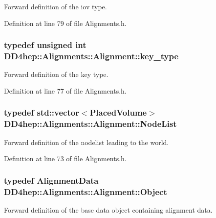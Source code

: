 Forward definition of the iov type. 

Definition at line 79 of file Alignments.h.\hypertarget{class_d_d4hep_1_1_alignments_1_1_alignment_ab824a65f935a0c79b9ea1a7a85014b88}{
\subsubsection[{key\_\-type}]{\setlength{\rightskip}{0pt plus 5cm}typedef unsigned int {\bf DD4hep::Alignments::Alignment::key\_\-type}}}
\label{class_d_d4hep_1_1_alignments_1_1_alignment_ab824a65f935a0c79b9ea1a7a85014b88}


Forward definition of the key type. 

Definition at line 77 of file Alignments.h.\hypertarget{class_d_d4hep_1_1_alignments_1_1_alignment_a83282984664b4e1117f46d8a8bc40cb7}{
\subsubsection[{NodeList}]{\setlength{\rightskip}{0pt plus 5cm}typedef std::vector$<${\bf PlacedVolume}$>$ {\bf DD4hep::Alignments::Alignment::NodeList}}}
\label{class_d_d4hep_1_1_alignments_1_1_alignment_a83282984664b4e1117f46d8a8bc40cb7}


Forward definition of the nodelist leading to the world. 

Definition at line 73 of file Alignments.h.\hypertarget{class_d_d4hep_1_1_alignments_1_1_alignment_a3ed6fd0370cb7b8015d772df7ff005fc}{
\subsubsection[{Object}]{\setlength{\rightskip}{0pt plus 5cm}typedef {\bf AlignmentData} {\bf DD4hep::Alignments::Alignment::Object}}}
\label{class_d_d4hep_1_1_alignments_1_1_alignment_a3ed6fd0370cb7b8015d772df7ff005fc}


Forward definition of the base data object containing alignment data. 

